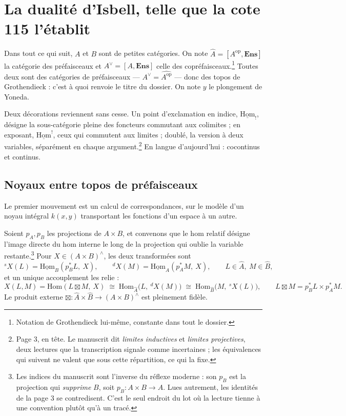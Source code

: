 \documentclass[11pt,a4paper]{article}
\begin{document}
\section*{La dualité d'Isbell, telle que la cote 115 l'établit}

Dans tout ce qui suit, $A$ et $B$ sont de petites catégories. On note
$\widehat{A} = [A^{\mathrm{op}}, \mathbf{Ens}]$ la catégorie des préfaisceaux
et $A^{\vee} = [A, \mathbf{Ens}]$ celle des copréfaisceaux.\footnote{Notation
de Grothendieck lui-même, constante dans tout le dossier.} Toutes deux sont
des catégories de préfaisceaux — $A^{\vee} = \widehat{A^{\mathrm{op}}}$ — donc
des topos de Grothendieck : c'est à quoi renvoie le titre du dossier. On note
$y$ le plongement de Yoneda.

Deux décorations reviennent sans cesse. Un point d'exclamation en indice,
$\underline{\mathrm{Hom}}_{!}$, désigne la sous-catégorie pleine des foncteurs
commutant aux colimites ; en exposant, $\underline{\mathrm{Hom}}^{!}$, ceux
qui commutent aux limites ; doublé, la version à deux variables, séparément en
chaque argument.\footnote{Page 3, en tête. Le manuscrit dit \emph{limites
inductives} et \emph{limites projectives}, deux lectures que la transcription
signale comme incertaines ; les équivalences qui suivent ne valent que sous
cette répartition, ce qui la fixe.} En langue d'aujourd'hui : cocontinus et
continus.

\subsection*{Noyaux entre topos de préfaisceaux}

Le premier mouvement est un calcul de correspondances, sur le modèle d'un
noyau intégral $k(x,y)$ transportant les fonctions d'un espace à un autre.

Soient $p_{A}, p_{B}$ les projections de $A \times B$, et convenons que le hom
relatif désigne l'image directe du hom interne le long de la projection qui
oublie la variable restante.\footnote{Les indices du manuscrit sont l'inverse
du réflexe moderne : son $p_{B}$ est la projection qui \emph{supprime} $B$,
soit $p_{B} : A \times B \to A$. Lues autrement, les identités de la page 3
se contredisent. C'est le seul endroit du lot où la lecture tienne à une
convention plutôt qu'à un tracé.} Pour $X \in (A \times B)^{\wedge}$, les deux
transformées sont
\[
{}^{s}X(L) = \underline{\mathrm{Hom}}_{B}(p_{B}^{*}L,\ X), \qquad
{}^{d}X(M) = \underline{\mathrm{Hom}}_{A}(p_{A}^{*}M,\ X),
\qquad L \in \widehat{A},\ M \in \widehat{B},
\]
et un unique accouplement les relie :
\[
X(L,M) = \mathrm{Hom}(L \boxtimes M,\ X)
\;\cong\; \mathrm{Hom}_{\widehat{A}}\bigl(L,\ {}^{d}X(M)\bigr)
\;\cong\; \mathrm{Hom}_{\widehat{B}}\bigl(M,\ {}^{s}X(L)\bigr),
\qquad L \boxtimes M = p_{B}^{*}L \times p_{A}^{*}M .
\]
Le produit externe $\boxtimes : \widehat{A} \times \widehat{B} \to (A \times
B)^{\wedge}$ est pleinement fidèle.
\end{document}

